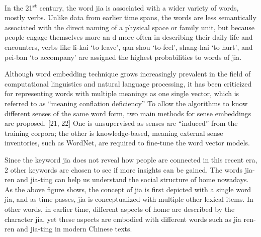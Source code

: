 In the 21\textsuperscript{st} century, the word jia is associated with a wider variety of words, mostly verbs. Unlike data from earlier time spans, the words are less semantically associated with the direct naming of a physical space or family unit, but because people engage themselves more an d more often in describing their daily life and encounters, verbs like li-kai `to leave', qan shou `to-feel', shang-hai `to hurt', and pei-ban `to accompany' are assigned the highest probabilities to words of jia. 

Although word embedding technique grows increasingly prevalent in the field of computational linguistics and natural language processing, it has been criticized for representing words with multiple meanings as one single vector, which is referred to as ``meaning conflation deficiency'' \parencite{camacho2018survey} To allow the algorithms to know different senses of the same word form, two main methods for sense embeddings are proposed. [21, 22] One is unsupervised as senses are ``induced'' from the training corpora; the other is knowledge-based, meaning external sense inventories, such as WordNet, are required to fine-tune the word vector models. 

Since the keyword jia does not reveal how people are connected in this recent era, 2 other keywords are chosen to see if more insights can be gained. The words jia-ren and jia-ting can help us understand the social structure of home nowadays. As the above figure shows, the concept of jia is first depicted with a single word jia, and as time passes, jia is conceptualized with multiple other lexical items. In other words, in earlier time, different aspects of home are described by the character jia, yet these aspects are embodied with different words such as jia ren-ren and jia-ting in modern Chinese texts.



